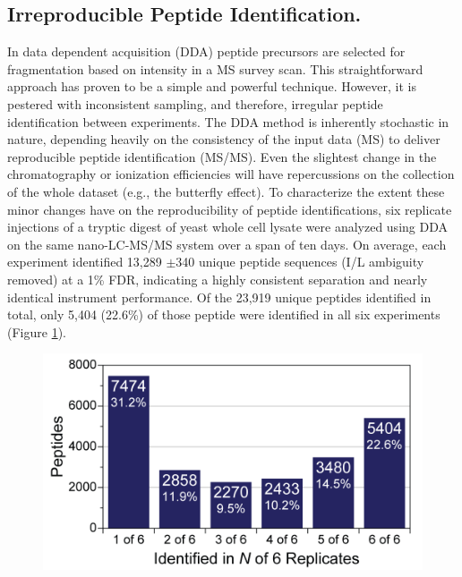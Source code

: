 \subsection*{Irreproducible Peptide Identification.}
In data dependent acquisition (DDA) peptide precursors are selected for fragmentation based on intensity in a MS survey scan. This straightforward approach has proven to be a simple and powerful technique. However, it is pestered with inconsistent sampling, and therefore, irregular peptide identification between experiments. The DDA method is inherently stochastic in nature, depending heavily on the consistency of the input data (MS) to deliver reproducible peptide identification (MS/MS). Even the slightest change in the chromatography or ionization efficiencies will have repercussions on the collection of the whole dataset (e.g., the butterfly effect). To characterize the extent these minor changes have on the reproducibility of peptide identifications, six replicate injections of a tryptic digest of yeast whole cell lysate were analyzed using DDA on the same nano-LC-MS/MS system over a span of ten days. On average, each experiment identified 13,289 $\pm$340 unique peptide sequences (I/L ambiguity removed) at a 1\% FDR, indicating a highly consistent separation and nearly identical instrument performance. Of the 23,919 unique peptides identified in total, only 5,404 (22.6\%) of those peptide were identified in all six experiments (Figure \ref{fig:eoa1}).
\begin{figure}
	\centering
	\includegraphics[width=\columnwidth]{eoa/EOA 1.png}
	\label{fig:eoa1}
\end{figure}
